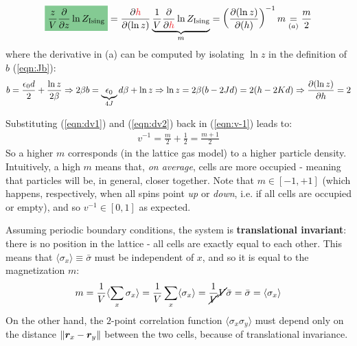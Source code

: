 \documentclass[../../main.tex]{subfiles}
\begin{document}
\begin{align}\label{eqn:dv2}
    \hlc{ForestGreen}{\frac{z}{V} \pdv{z} \ln Z_{\mathrm{Ising} }} =  \pdv{\textcolor{Red}{h}}{(\ln z)} \underbrace{\frac{1}{V}\pdv{\textcolor{Red}{h}} \ln Z_{\mathrm{Ising}}}_{m} = \left(\pdv{(\ln z)}{(h)}\right)^{-1} m \underset{(a)}{=}  \frac{m}{2} 
\end{align}
where the derivative in (a) can be computed by isolating $\ln z$ in the definition of $b$ (\ref{eqn:Jb}):
\begin{align*}
    b = \frac{\epsilon_0 d}{2} + \frac{\ln z}{2 \beta} \Rightarrow 2 \beta b = \underbrace{\epsilon_0 }_{4J}d \beta + \ln z \Rightarrow \ln z = 2\beta(b - 2 J d) = 2(h- 2 K d) \Rightarrow \pdv{(\ln z)}{h} = 2
\end{align*}

Substituting (\ref{eqn:dv1}) and (\ref{eqn:dv2}) back in (\ref{eqn:v-1}) leads to:
\begin{align}\label{eqn:v-density}
    v^{-1} = \frac{m}{2} + \frac{1}{2} = \frac{m+1}{2}   
\end{align}
So a higher $m$ corresponds (in the lattice gas model) to a higher particle density. Intuitively, a high $m$ means that, \textit{on average}, cells are more occupied - meaning that particles will be, in general, closer together. Note that $m \in [-1,+1]$ (which happens, respectively, when all spins point \textit{up} or \textit{down}, i.e. if all cells are occupied or empty), and so $v^{-1} \in [0, 1]$ as expected. 

\medskip

Assuming periodic boundary conditions, the system is \textbf{translational invariant}: there is no  position in the lattice - all cells are exactly equal to each other. This means that $\langle \sigma_x \rangle \equiv \bar{\sigma}$ must be independent of $x$, and so it is equal to the magnetization $m$:
\begin{align*}
    m = \frac{1}{V} \langle \sum_x \sigma_x \rangle =  \frac{1}{V} \sum_x \langle \sigma_x \rangle = \frac{1}{\cancel{V}} \cancel{V} \bar{\sigma} = \bar{\sigma} = \langle \sigma_x \rangle
\end{align*}
On the other hand, the $2$-point correlation function $\langle \sigma_x \sigma_y \rangle$ must depend only on the distance $\norm{\bm{r}_x - \bm{r}_y}$ between the two cells, because of translational invariance. 

\medskip
\end{document}
